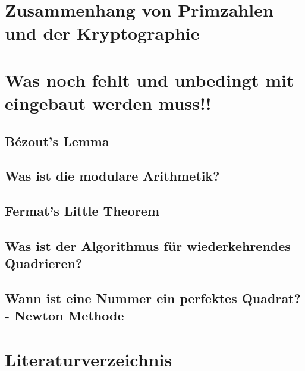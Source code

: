 \documentclass[german,12pt,a4paper]{article}
\begin{document}
\section{Zusammenhang von Primzahlen und der Kryptographie}

\newpage

\section{Was noch fehlt und unbedingt mit eingebaut werden muss!!}
\subsection{Bézout's Lemma}
\subsection{Was ist die modulare Arithmetik?}
\subsection{Fermat's Little Theorem}
\subsection{Was ist der Algorithmus für wiederkehrendes Quadrieren?}
\subsection{Wann ist eine Nummer ein perfektes Quadrat? - Newton Methode}
\newpage

\section*{Literaturverzeichnis}
\printbibliography

\newpage

\listoftables
{}
\newpage

\listoffigures
{}
\end{document}

